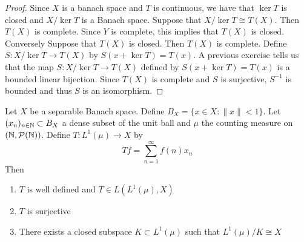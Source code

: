 \documentclass{book}
\begin{document}
	\begin{proof}
		Since $X$ is a banach space and $T$ is continuous, we have that $\ker T$ is closed and $X/ \ker T$ is a Banach space. Suppose that $X/ \ker T \cong T(X)$. Then $T(X)$ is complete. Since $Y$ is complete, this implies that $T(X)$ is closed. \\
		Conversely Suppose that $T(X)$ is closed. Then $T(X)$ is complete. Define $S: X/ \ker T \rightarrow T(X)$ by $S(x + \ker T) = T(x)$. A previous exercise tells us that the map $S: X/ \ker T \rightarrow T(X)$ defined by $S(x + \ker T) = T(x)$ is a bounded linear bijection. Since $T(X)$ is complete and $S$ is surjective, $S^{-1}$ is bounded and thus $S$ is an isomorphism.   
	\end{proof}
	
	\begin{ex} \lex{}
		Let $X$ be a separable Banach space. Define $B_X = \{x \in X: \|x \|< 1\}$. Let $(x_n)_{n \in \mathbb{N}} \subset B_X $ a dense subset of the unit ball and $\mu$ the counting measure on $(\mathbb{N}, \mathcal{P}(\mathbb{N}))$. Define $T: L^1(\mu) \rightarrow X$ by $$Tf = \sum_{n=1}^{\infty}f(n)x_n$$ Then 
		\begin{enumerate}
			\item $T$ is well defined and $T \in L(L^1(\mu), X)$
			\item $T$ is surjective
			\item There exists a closed subspace $K \subset L^1(\mu)$ such that $L^1(\mu)/K \cong X$ 
		\end{enumerate} 
	\end{ex}
	
\end{document}
